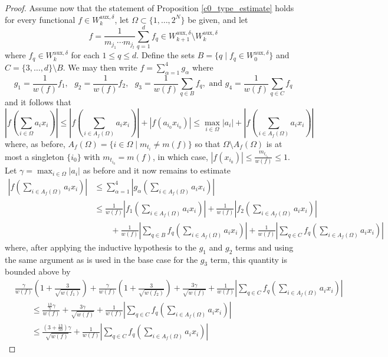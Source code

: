 \documentclass[10pt,a4paper]{amsart}
\newcommand{\bes}{\begin{equation*}}
\newcommand{\ees}{\end{equation*}}
\begin{document}
\begin{proof}
Assume now that the statement of Proposition \ref{c0_type_estimate} holds for every functional $f\in W^{\text{aux},\delta}_{k}$, let $\Omega\subset\{1,\ldots,2^{N}\}$ be given, and let 
\bes f=\frac{1}{m_{j_{1}}\cdots m_{j_{l}}}\sum_{q=1}^{d}f_{q}\in W^{\text{aux},\delta}_{k+1}\setminus W^{\text{aux},\delta}_{k} \ees
where $f_{q}\in W^{\text{aux},\delta}_{k}$ for each $1\leq q\leq d$. Define the sets $B=\{q \mid f_{q}\in W^{\text{aux},\delta}_{0}\}$ and $C=\{3,\ldots,d\}\setminus B$. We may then write $f=\sum_{\alpha=1}^{4}g_{\alpha}$ where
\bes g_{1}=\frac{1}{w(f)}f_{1},\text{ }g_{2}=\frac{1}{w(f)}f_{2},\text{ }g_{3}=\frac{1}{w(f)}\sum_{q\in B}f_{q}, \text{ and } g_{4}=\frac{1}{w(f)}\sum_{q\in C}f_{q} \ees
and it follows that
\bes \left\vert f\left(\sum_{i\in\Omega}a_{i}x_{i}\right)\right\vert \leq \left\vert f\left(\sum_{i\in A_{f}(\Omega)}a_{i}x_{i}\right)\right\vert + |f(a_{i_{0}}x_{i_{0}})| \leq \max_{i\in\Omega}|a_{i}|+\left\vert f\left(\sum_{i\in A_{f}(\Omega)}a_{i}x_{i}\right)\right\vert \ees
where, as before, $A_{f}(\Omega)=\{ i\in\Omega \mid m_{t_{i}}\neq m(f)\}$ so that $\Omega\setminus A_{f}(\Omega)$ is at most a singleton $\{i_{0}\}$ with $m_{t_{i_{0}}}=m(f)$, in which case, $|f(x_{i_{0}})|\leq \frac{m_{t_{i_{0}}}}{w(f)}\leq 1$. Let $\gamma=\max_{i\in\Omega}|a_{i}|$ as before and it now remains to estimate
\begin{align*} \left\vert f\left(\sum_{i\in A_{f}(\Omega)}a_{i}x_{i}\right)\right\vert&\leq \sum_{\alpha=1}^{4}\left\vert g_{\alpha}\left(\sum_{i\in A_{f}(\Omega)}a_{i}x_{i}\right)\right\vert \\ &\leq\frac{1}{w(f)}\left\vert f_{1}\left(\sum_{i\in A_{f}(\Omega)}a_{i}x_{i}\right)\right\vert + \frac{1}{w(f)}\left\vert f_{2}\left(\sum_{i\in A_{f}(\Omega)}a_{i}x_{i}\right)\right\vert  \\  &\qquad + \frac{1}{w(f)}\left\vert \sum_{q\in B}f_{q}\left(\sum_{i\in A_{f}(\Omega)}a_{i}x_{i}\right)\right\vert + \frac{1}{w(f)}\left\vert\sum_{q\in C}f_{q}\left(\sum_{i\in A_{f}(\Omega)}a_{i}x_{i}\right)\right\vert  \end{align*} 
where, after applying the inductive hypothesis to the $g_{1}$ and $g_{2}$ terms and using the same argument as is used in the base case for the $g_{3}$ term, this quantity is bounded above by
\begin{align*} &\frac{\gamma}{w(f)}\left(1+\frac{3}{\sqrt{w(f_{1})}}\right)+\frac{\gamma}{w(f)}\left(1+\frac{3}{\sqrt{w(f_{2})}}\right) +\frac{3\gamma}{\sqrt{w(f)}}+\frac{1}{w(f)}\left\vert \sum_{q\in C}f_{q}\left(\sum_{i\in A_{f}(\Omega)}a_{i}x_{i}\right)\right\vert \\  &\qquad\leq \frac{\frac{13}{5}\gamma}{w(f)}+\frac{3\gamma}{\sqrt{w(f)}}+\frac{1}{w(f)}\left\vert\sum_{q\in C}f_{q}\left(\sum_{i\in A_{f}(\Omega)}a_{i}x_{i}\right)\right\vert \\ &\qquad\leq \frac{(3+\frac{13}{50})\gamma}{\sqrt{w(f)}}+ \frac{1}{w(f)}\left\vert\sum_{q\in C}f_{q}\left(\sum_{i\in A_{f}(\Omega)}a_{i}x_{i}\right)\right\vert \end{align*}

\end{proof}
\end{document}
